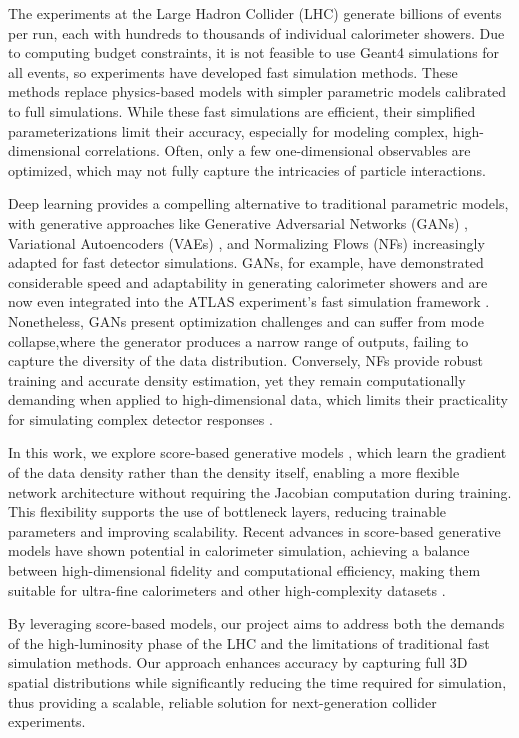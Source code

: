 The experiments at the Large Hadron Collider (LHC) generate billions of events per run, each with hundreds to thousands of individual calorimeter showers. Due to computing budget constraints, it is not feasible to use Geant4 simulations for all events, so experiments have developed fast simulation methods. These methods replace physics-based models with simpler parametric models calibrated to full simulations. While these fast simulations are efficient, their simplified parameterizations limit their accuracy, especially for modeling complex, high-dimensional correlations. Often, only a few one-dimensional observables are optimized, which may not fully capture the intricacies of particle interactions.

Deep learning provides a compelling alternative to traditional parametric models, with generative approaches like Generative Adversarial Networks (GANs) \cite{goodfellow2014}, Variational Autoencoders (VAEs) \cite{kingma2013}, and Normalizing Flows (NFs) \cite{dinh2016} increasingly adapted for fast detector simulations. GANs, for example, have demonstrated considerable speed and adaptability in generating calorimeter showers \cite{paganini2018} and are now even integrated into the ATLAS experiment’s fast simulation framework \cite{atlas2018}. Nonetheless, GANs present optimization challenges and can suffer from mode collapse,where the generator produces a narrow range of outputs, failing to capture the diversity of the data distribution. Conversely, NFs provide robust training and accurate density estimation, yet they remain computationally demanding when applied to high-dimensional data, which limits their practicality for simulating complex detector responses \cite{verheyen2021, verheyen2021b}.

In this work, we explore score-based generative models \cite{song2020}, which learn the gradient of the data density rather than the density itself, enabling a more flexible network architecture without requiring the Jacobian computation during training. This flexibility supports the use of bottleneck layers, reducing trainable parameters and improving scalability. Recent advances in score-based generative models have shown potential in calorimeter simulation, achieving a balance between high-dimensional fidelity and computational efficiency, making them suitable for ultra-fine calorimeters and other high-complexity datasets \cite{cms2017, cms2018}.

By leveraging score-based models, our project aims to address both the demands of the high-luminosity phase of the LHC and the limitations of traditional fast simulation methods. Our approach enhances accuracy by capturing full 3D spatial distributions while significantly reducing the time required for simulation, thus providing a scalable, reliable solution for next-generation collider experiments.

